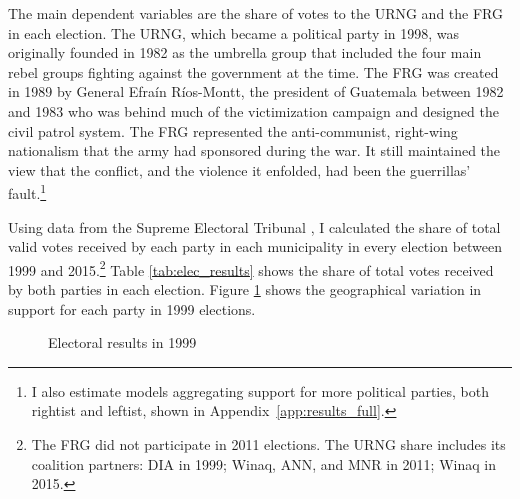\documentclass[12pt, notitlepage]{article}
\begin{document}
The main dependent variables are the share of votes to the URNG and the FRG in each election.
The URNG, which became a political party in 1998, was originally founded in 1982 as the umbrella group that included the four main rebel groups fighting against the government at the time.
The FRG was created in 1989 by General Efraín Ríos-Montt, the president of Guatemala between 1982 and 1983 who was behind much of the victimization campaign and designed the civil patrol system.
The FRG represented the anti-communist, right-wing nationalism that the army had sponsored during the war.
It still maintained the view that the conflict, and the violence it enfolded, had been the guerrillas' fault.\footnote{I also estimate models aggregating support for more political parties, both rightist and leftist, shown in Appendix~\ref{app:results_full}.}

Using data from the Supreme Electoral Tribunal \citep{TSE:2019aa}, I calculated the share of total valid votes received by each party in each municipality in every election between 1999 and 2015.\footnote{The FRG did not participate in 2011 elections. The URNG share includes its coalition partners: DIA in 1999; Winaq, ANN, and MNR in 2011; Winaq in 2015.}
Table \ref{tab:elec_results} shows the share of total votes received by both parties in each election.
Figure \ref{fig:map_elec1999} shows the geographical variation in support for each party in 1999 elections.

\begin{figure}[!ht]
    \centering

    \begin{minipage}{1\textwidth}
      \centering
      \hspace{25pt}
    \end{minipage}

    \caption{Electoral results in 1999}\label{fig:map_elec1999}

\end{figure}
\end{document}
